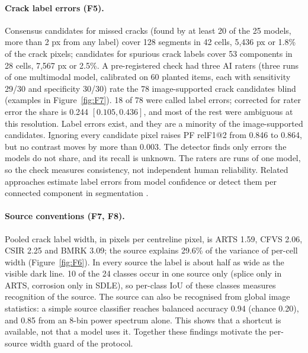 \paragraph{Crack label errors (F5).} Consensus candidates for missed cracks (found by at least 20 of the 25 models, more than 2 px
from any label) cover 128 segments in 42 cells, 5,436 px or 1.8\% of the crack pixels; candidates for spurious crack labels cover
53 components in 28 cells, 7,567 px or 2.5\%. A pre-registered check had three AI raters (three runs of one multimodal model,
calibrated on 60 planted items, each with sensitivity 29/30 and specificity 30/30) rate the 78 image-supported crack candidates
blind (examples in Figure~\ref{fig:F7}). 18 of 78 were called label errors; corrected for rater error the share is 0.244 $[0.105, 0.436]$, and most of the rest were
ambiguous at this resolution. Label errors exist, and they are a minority of the image-supported candidates. Ignoring every
candidate pixel raises PF relF1@2 from 0.846 to 0.864, but no contrast moves by more than 0.003. The detector finds only errors the
models do not share, and its recall is unknown. The raters are runs of one model, so the check measures consistency, not
independent human reliability. Related approaches estimate label errors from model confidence \citep{northcutt2021confident} or detect them per
connected component in segmentation \citep{rottmann2023labelerrors}.


\paragraph{Source conventions (F7, F8).} Pooled crack label width, in pixels per centreline pixel, is ARTS 1.59, CFVS 2.06, CSIR 2.25 and
BMRK 3.09; the source explains 29.6\% of the variance of per-cell width (Figure~\ref{fig:F6}). In every source the label is about half as wide as the
visible dark line. 10 of the 24 classes occur in one source only (splice only in ARTS, corrosion only in SDLE), so per-class IoU of
these classes measures recognition of the source. The source can also be recognised from global image statistics: a simple source
classifier reaches balanced accuracy 0.94 (chance 0.20), and 0.85 from an 8-bin power spectrum alone. This shows that a shortcut is
available, not that a model uses it. Together these findings motivate the per-source width guard of the protocol.

